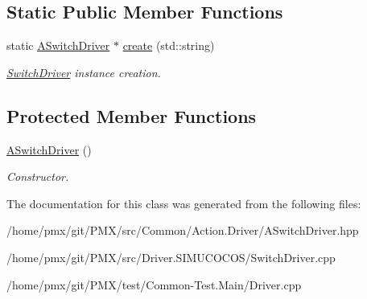 \subsection*{Static Public Member Functions}
\begin{DoxyCompactItemize}
\item 
\mbox{\label{classASwitchDriver_a48667bd3e9828c35b26525bd368e5e57}} 
static \hyperlink{classASwitchDriver}{A\+Switch\+Driver} $\ast$ \hyperlink{classASwitchDriver_a48667bd3e9828c35b26525bd368e5e57}{create} (std\+::string)
\begin{DoxyCompactList}\small\item\em \hyperlink{classSwitchDriver}{Switch\+Driver} instance creation. \end{DoxyCompactList}\end{DoxyCompactItemize}
\subsection*{Protected Member Functions}
\begin{DoxyCompactItemize}
\item 
\mbox{\label{classASwitchDriver_aaf76fcc6d83c47328193a1b614077019}} 
\hyperlink{classASwitchDriver_aaf76fcc6d83c47328193a1b614077019}{A\+Switch\+Driver} ()
\begin{DoxyCompactList}\small\item\em Constructor. \end{DoxyCompactList}\end{DoxyCompactItemize}


The documentation for this class was generated from the following files\+:\begin{DoxyCompactItemize}
\item 
/home/pmx/git/\+P\+M\+X/src/\+Common/\+Action.\+Driver/A\+Switch\+Driver.\+hpp\item 
/home/pmx/git/\+P\+M\+X/src/\+Driver.\+S\+I\+M\+U\+C\+O\+C\+O\+S/Switch\+Driver.\+cpp\item 
/home/pmx/git/\+P\+M\+X/test/\+Common-\/\+Test.\+Main/Driver.\+cpp\end{DoxyCompactItemize}
